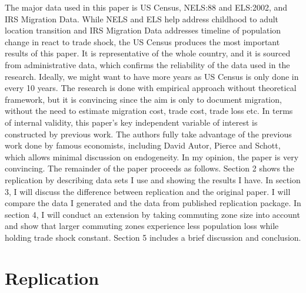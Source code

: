 \documentclass[12pt, final]{CSP}
\begin{document}
\newline
\newline
The major data used in this paper is US Census, NELS:88 and ELS:2002, and IRS Migration Data. While NELS and ELS help address childhood to adult location transition and IRS Migration Data addresses timeline of population change in react to trade shock, the US Census produces the most important results of this paper. It is representative of the whole country, and it is sourced from administrative data, which confirms the reliability of the data used in the research. Ideally, we might want to have more years as US Census is only done in every 10 years. 
\newline
\newline
The research is done with empirical approach without theoretical framework, but it is convincing since the aim is only to document migration, without the need to estimate migration cost, trade cost, trade loss etc. In terms of internal validity, this paper’s key independent variable of interest is constructed by previous work. The authors fully take advantage of the previous work done by famous economists, including David Autor, Pierce and Schott, which allows minimal discussion on endogeneity. In my opinion, the paper is very convincing. 
\newline
\newline
The remainder of the paper proceeds as follows. Section 2 shows the replication by describing data sets I use and showing the results I have. In section 3, I will discuss the difference between replication and the original paper. I will compare the data I generated and the data from published replication package. In section 4, I will conduct an extension by taking commuting zone size into account and show that larger commuting zones experience less population loss while holding trade shock constant. Section 5 includes a brief discussion and conclusion.


\section{Replication}
\noindent
\end{document}

